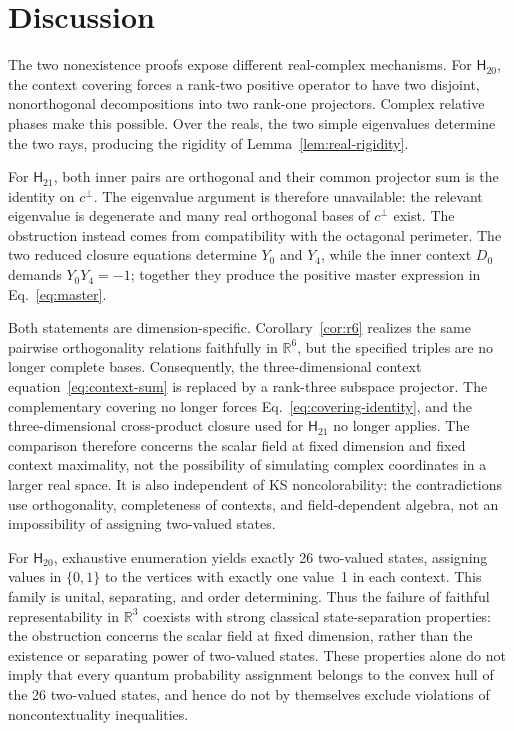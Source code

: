 \documentclass[twocolumn,aps,pra,floatfix,amsmath,amssymb,longbibliography]{revtex4-2}
\theoremstyle{definition}
\theoremstyle{remark}
\newcommand{\R}{\mathbb R}
\newcommand{\Htwenty}{\mathsf H_{20}}
\newcommand{\Htwentyone}{\mathsf H_{21}}
\begin{document}
\section{Discussion}

The two nonexistence proofs expose different real-complex mechanisms.
For $\Htwenty$, the context covering forces a rank-two positive operator
to have two disjoint, nonorthogonal decompositions into two rank-one
projectors.  Complex relative phases make this possible.  Over the
reals, the two simple eigenvalues determine the two rays, producing the
rigidity of Lemma~\ref{lem:real-rigidity}.

For $\Htwentyone$, both inner pairs are orthogonal and their common
projector sum is the identity on $c^\perp$.  The eigenvalue argument is
therefore unavailable: the relevant eigenvalue is degenerate and many
real orthogonal bases of $c^\perp$ exist.  The obstruction instead comes
from compatibility with the octagonal perimeter.  The two reduced
closure equations determine $Y_0$ and $Y_4$, while the inner context
$D_0$ demands $Y_0Y_4=-1$; together they produce the positive master
expression in Eq.~\eqref{eq:master}.

Both statements are dimension-specific.  Corollary~\ref{cor:r6} realizes the
same pairwise orthogonality relations faithfully in $\R^6$, but the specified
triples are no longer complete bases.  Consequently, the three-dimensional
context equation~\eqref{eq:context-sum} is replaced by a rank-three subspace
projector.  The complementary covering no longer forces
Eq.~\eqref{eq:covering-identity}, and the three-dimensional cross-product
closure used for $\Htwentyone$ no longer applies.  The comparison therefore
concerns the scalar field at fixed dimension and fixed context maximality,
not the possibility of simulating complex coordinates in a larger real
space.  It is also independent of KS noncolorability: the contradictions use
orthogonality, completeness of contexts, and field-dependent algebra, not an
impossibility of assigning two-valued states.

For $\Htwenty$, exhaustive enumeration yields exactly 26 two-valued
states, assigning values in $\{0,1\}$ to the vertices with exactly one
value~1 in each context.  This family is unital, separating, and
order determining.  Thus the failure of faithful representability in
$\R^3$ coexists with strong classical state-separation properties:
the obstruction concerns the scalar field at fixed dimension, rather
than the existence or separating power of two-valued states.  These
properties alone do not imply that every quantum probability assignment
belongs to the convex hull of the 26 two-valued states, and hence do not
by themselves exclude violations of noncontextuality inequalities.
\end{document}
